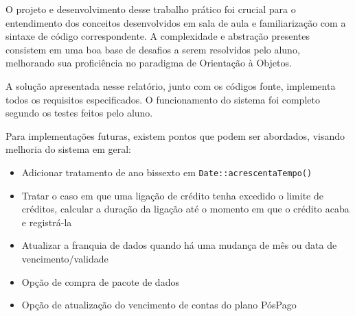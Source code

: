 O projeto e desenvolvimento desse trabalho prático foi crucial para o entendimento dos conceitos desenvolvidos em sala de aula e familiarização com a sintaxe de código correspondente. A complexidade e abstração presentes consistem em uma boa base de desafios a serem resolvidos pelo aluno, melhorando sua proficiência no paradigma de Orientação à Objetos. 

A solução apresentada nesse relatório, junto com os códigos fonte, implementa todos os requisitos especificados. O funcionamento do sistema foi completo segundo os testes feitos pelo aluno. 

Para implementações futuras, existem pontos que podem ser abordados, visando melhoria do sistema em geral: 

\begin{itemize}
	\item Adicionar tratamento de ano bissexto em \texttt{Date::acrescentaTempo()}
	\item Tratar o caso em que uma ligação de crédito tenha excedido o limite de créditos, calcular a duração da ligação até o momento em que o crédito acaba e registrá-la
	
	\item Atualizar a franquia de dados quando há uma mudança de mês ou data de vencimento/validade
	
	\item Opção de compra de pacote de dados
	
	\item Opção de atualização do vencimento de contas do plano PósPago
\end{itemize}